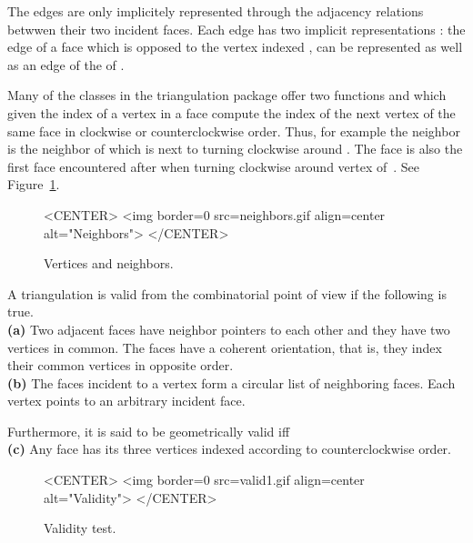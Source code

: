 The edges  are only implicitely represented
through the adjacency relations betwwen their  two incident
faces. Each edge has two implicit representations : the edge
of a face   which is opposed to the vertex indexed ,
can be represented as well as an edge of the  of 
.


Many of the classes in the triangulation package
offer  two functions  and 
which given the index of a vertex in a face
compute the index of the next vertex  of the same face
in clockwise
or counterclockwise order.
 Thus, for example the neighbor 
 is
 the
neighbor of   which is next to  turning clockwise
around . The face 
is also the first face encountered after  when
turning clockwise around vertex 
of~. See Figure~\ref{I1_Fig_neighbors}.



 \begin{figure}
\begin{ccTexOnly}
    \begin{center}
     
    \end{center}
\end{ccTexOnly} 
    \caption{Vertices and neighbors.
    \label{I1_Fig_neighbors}}
  \begin{ccHtmlOnly}
<CENTER>
<img border=0 src=neighbors.gif align=center alt="Neighbors">
</CENTER>
\end{ccHtmlOnly} 
\end{figure}



\smallskip
A triangulation is valid from the combinatorial point of view if the
following is true.
\\
{\bf (a)} Two adjacent faces have neighbor pointers to each 
other and they have two vertices in common. 
The faces have a
coherent orientation, that is, they index their common  vertices 
in opposite order.
\\
{\bf (b)} The faces incident to a vertex  
form a circular list of neighboring faces.
Each vertex   points to an 
arbitrary incident face. 

Furthermore, it is said to be geometrically valid iff
\\
{\bf (c)} Any face has its three vertices indexed according to
counterclockwise order.

\smallskip
\begin{figure}
\begin{ccTexOnly}
\begin{center}  \end{center}
\end{ccTexOnly} 
\caption{Validity test.
\label{I1_Fig_valid}}

\begin{ccHtmlOnly}
<CENTER>
<img border=0 src=valid1.gif align=center alt="Validity">
</CENTER>
\end{ccHtmlOnly} 
\end{figure}



